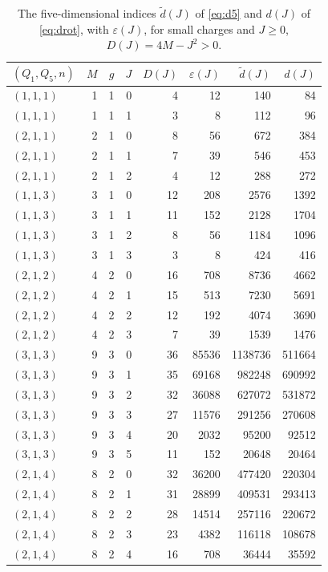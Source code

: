 \documentclass[11pt]{amsart}
\theoremstyle{definition}
\newcommand{\dt}{\tilde d}
\begin{document}
\begin{table}[ht]\centering\footnotesize
\caption{The five-dimensional indices $\dt(J)$ of \eqref{eq:d5} and $d(J)$ of \eqref{eq:drot}, with $\varepsilon(J)$, for small charges and $J\ge0$, $D(J)=4M-J^2>0$.}\label{tab:ex5d}
\begin{tabular}{@{}lrrrrrrr@{}}\toprule
$(Q_1,Q_5,n)$ & $M$ & $g$ & $J$ & $D(J)$ & $\varepsilon(J)$ & $\dt(J)$ & $d(J)$\\\midrule
$(1,1,1)$ & 1 & 1 & 0 & 4 & 12 & 140 & 84\\
$(1,1,1)$ & 1 & 1 & 1 & 3 & 8 & 112 & 96\\
$(2,1,1)$ & 2 & 1 & 0 & 8 & 56 & 672 & 384\\
$(2,1,1)$ & 2 & 1 & 1 & 7 & 39 & 546 & 453\\
$(2,1,1)$ & 2 & 1 & 2 & 4 & 12 & 288 & 272\\
$(1,1,3)$ & 3 & 1 & 0 & 12 & 208 & 2576 & 1392\\
$(1,1,3)$ & 3 & 1 & 1 & 11 & 152 & 2128 & 1704\\
$(1,1,3)$ & 3 & 1 & 2 & 8 & 56 & 1184 & 1096\\
$(1,1,3)$ & 3 & 1 & 3 & 3 & 8 & 424 & 416\\
$(2,1,2)$ & 4 & 2 & 0 & 16 & 708 & 8736 & 4662\\
$(2,1,2)$ & 4 & 2 & 1 & 15 & 513 & 7230 & 5691\\
$(2,1,2)$ & 4 & 2 & 2 & 12 & 192 & 4074 & 3690\\
$(2,1,2)$ & 4 & 2 & 3 & 7 & 39 & 1539 & 1476\\
$(3,1,3)$ & 9 & 3 & 0 & 36 & 85536 & 1138736 & 511664\\
$(3,1,3)$ & 9 & 3 & 1 & 35 & 69168 & 982248 & 690992\\
$(3,1,3)$ & 9 & 3 & 2 & 32 & 36088 & 627072 & 531872\\
$(3,1,3)$ & 9 & 3 & 3 & 27 & 11576 & 291256 & 270608\\
$(3,1,3)$ & 9 & 3 & 4 & 20 & 2032 & 95200 & 92512\\
$(3,1,3)$ & 9 & 3 & 5 & 11 & 152 & 20648 & 20464\\
$(2,1,4)$ & 8 & 2 & 0 & 32 & 36200 & 477420 & 220304\\
$(2,1,4)$ & 8 & 2 & 1 & 31 & 28899 & 409531 & 293413\\
$(2,1,4)$ & 8 & 2 & 2 & 28 & 14514 & 257116 & 220672\\
$(2,1,4)$ & 8 & 2 & 3 & 23 & 4382 & 116118 & 108678\\
$(2,1,4)$ & 8 & 2 & 4 & 16 & 708 & 36444 & 35592\\

\end{tabular}
\end{table}
\end{document}
